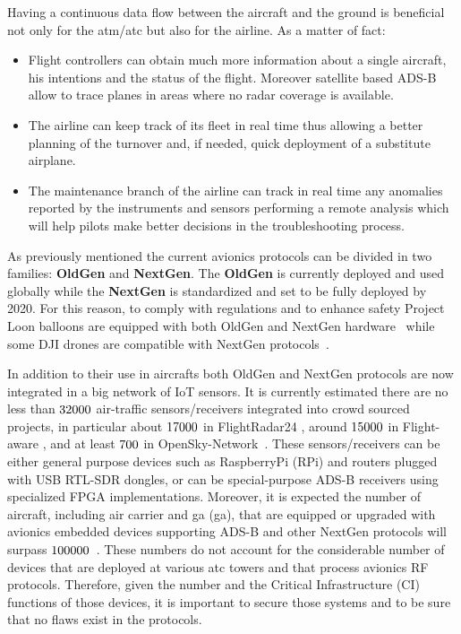 \documentclass[../main.tex]{subfiles}
\begin{document}
Having a continuous data flow between the aircraft and the ground is beneficial not only for the \acrshort{atm}/\acrshort{atc} but also for the airline. As a matter of fact:
\begin{itemize}
  \item Flight controllers can obtain much more information about a single aircraft, his intentions and the status of the flight. Moreover satellite based ADS-B allow to trace planes in areas where no radar coverage is available.
  \item The airline can keep track of its fleet in real time thus allowing a better planning of the turnover and, if needed, quick deployment of a substitute airplane.
  \item The maintenance branch of the airline can track in real time any anomalies reported by the instruments and sensors performing a remote analysis which will help pilots make better decisions in the troubleshooting process.
\end{itemize}

As previously mentioned the current avionics protocols can be divided in two
families: \textbf{OldGen} and \textbf{NextGen}. The \textbf{OldGen} is currently
deployed and used globally while the \textbf{NextGen} is standardized and set to
be fully deployed by 2020. For this reason, to comply with regulations and to
enhance safety Project Loon balloons are equipped with both OldGen and NextGen
hardware~\cite{loonadsb} while some DJI drones are compatible with NextGen
protocols~\cite{dji}.

In addition to their use in aircrafts both OldGen and NextGen protocols are now
integrated in a big network of IoT sensors. It is currently estimated there are
no less than $32000$ air-traffic sensors/receivers integrated into
crowd sourced projects, in particular about $17000$ in
FlightRadar24 \cite{countFRadar}, around $15000$ in Flight-aware
\cite{countFAware}, and at least $700$ in
OpenSky-Network~\cite{schafer2017opensky}. These sensors/receivers can be either
general purpose devices such as RaspberryPi (RPi) and routers plugged with USB
RTL-SDR dongles, or can be special-purpose ADS-B receivers using specialized
FPGA implementations.
%
Moreover, it is expected the number of aircraft, including air carrier and \acrlong{ga} (\acrshort{ga}), that are equipped or upgraded with avionics embedded devices supporting ADS-B and other NextGen protocols will surpass $100000$~\cite{countFAA}.
These numbers do not account for the considerable number of devices that are deployed at various \acrshort{atc} towers and that process avionics RF protocols. Therefore, given the number and the Critical Infrastructure (CI) functions of those devices, it is important to secure those systems and to be sure that no flaws exist in the protocols.
\end{document}
